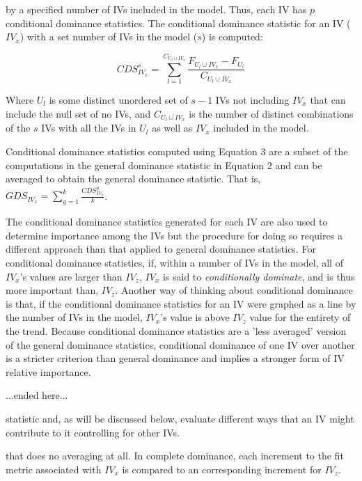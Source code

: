 \documentclass[ShortAfour,times,sageapa]{sagej}
\begin{document}
	 by a specified number of IVs included in the model.
	Thus, each IV has $p$ conditional dominance statistics.
	The conditional dominance statistic for an IV ($IV_x$) with a set number of IVs in the model ($s$) is computed:
	
	\begin{equation}
		CDS_{IV_x}^{s} = \sum_{l=1}^{C_{U_l \cup IV_x}} \frac{ F_{U_l \cup IV_x} - F_{U_l}}{C_{U_l \cup IV_x}}
	\end{equation}
	
	Where $U_l$ is some distinct unordered set of $s-1$ IVs not including $IV_x$ that can include the null set of no IVs, and $C_{U_l \cup IV_x}$ is the number of distinct combinations of the $s$ IVs with all the IVs in $U_l$ as well as $IV_x$ included in the model.
	
	Conditional dominance statistics computed using Equation 3 are a subset of the computations in the general dominance statistic in Equation 2 and can be averaged to obtain the general dominance statistic.  
	That is, $GDS_{IV_x} = \sum_{g=1}^{k} \frac{CDS_{IV_x}^{g}}{k}$.
	
	The conditional dominance statistics generated for each IV are also used to determine importance among the IVs but the procedure for doing so requires a different approach than that applied to general dominance statistics.
	For conditional dominance statistics, if, within a number of IVs in the model, all of $IV_x$'s values are larger than $IV_z$, $IV_x$ is said to \emph{conditionally dominate}, and is thus more important than, $IV_z$.
	Another way of thinking about conditional dominance is that, if the conditional dominance statistics for an IV were graphed as a line by the number of IVs in the model, $IV_x$'s value is above $IV_z$ value for the entirety of the trend.	
	Because conditional dominance statistics are a 'less averaged' version of the general dominance statistics, conditional dominance of one IV over another is a stricter criterion than general dominance and implies a stronger form of IV relative importance.
	
	
	...ended here...
	
	statistic and, as will be discussed below, evaluate different ways that an IV might contribute to it controlling for other IVs.
	
	that does no averaging at all.
	In complete dominance, each increment to the fit metric associated with $IV_x$ is compared to an corresponding increment for $IV_z$.
	
	
	
\end{document}
